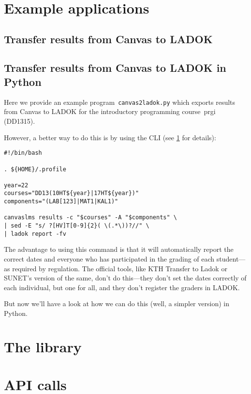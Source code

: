 \documentclass[a4paper,oneside]{memoir}
\begin{document}




\part{Example applications}

\chapter{Transfer results from Canvas to LADOK}\label{SomeScripts}



\chapter{Transfer results from Canvas to LADOK in Python}

Here we provide an example program~\texttt{canvas2ladok.py} which exports 
results from Canvas to LADOK for the introductory programming course~prgi 
(DD1315).

However, a better way to do this is by using the CLI
(see \cref{SomeScripts} for details):
\begin{verbatim}
#!/bin/bash

. ${HOME}/.profile

year=22
courses="DD13(10HT${year}|17HT${year})"
components="(LAB[123]|MAT1|KAL1)"

canvaslms results -c "$courses" -A "$components" \
| sed -E "s/ ?[HV]T[0-9]{2}( \(.*\))?//" \
| ladok report -fv
\end{verbatim}
The advantage to using this command is that it will automatically report the 
correct dates and everyone who has participated in the grading of each 
student---as required by regulation.
The official tools, like KTH Transfer to Ladok or SUNET's version of the same, 
don't do this---they don't set the dates correctly of each individual, but one 
for all, and they don't register the graders in LADOK.

But now we'll have a look at how we can do this (well, a simpler version) in 
Python.





\part{The library}




\part{API calls}






\backmatter
\printbibliography
\end{document}
